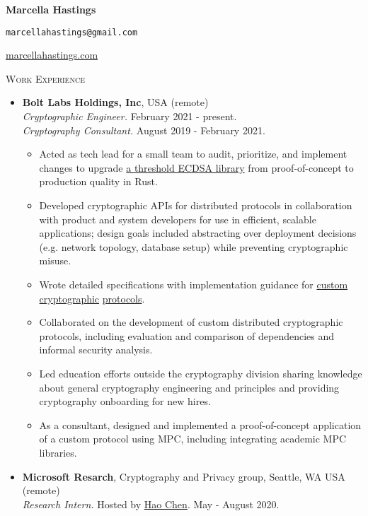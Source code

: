 \documentclass{article}
\newcommand{\textbox}[1]{\parbox{.333\textwidth}{#1}}
\begin{document}
\pagestyle{empty}
\noindent\textbox{\textbf{Marcella Hastings}\hfill}\textbox{\centering \texttt{marcellahastings@gmail.com}}\textbox{\hfill \href{http://marcellahastings.com}{marcellahastings.com}}

\textsc{Work Experience} \hrulefill
\begin{itemize}[label={}]
  \item \textbf{Bolt Labs Holdings, Inc}, USA (remote) \\
  \textit{Cryptographic Engineer.} February 2021 - present.\\
  \textit{Cryptography Consultant.} August 2019 - February 2021.
  \begin{itemize}[leftmargin=*, noitemsep, topsep=0pt]
    \item Acted as tech lead for a small team to audit, prioritize, and implement changes to upgrade \href{https://github.com/boltlabs-inc/tss-ecdsa}{a threshold ECDSA library} from proof-of-concept to production quality in Rust.
    \item Developed cryptographic APIs for distributed protocols in collaboration with product and system developers for use in efficient, scalable applications; design goals included abstracting over deployment decisions (e.g. network topology, database setup) while preventing cryptographic misuse.
    \item Wrote detailed specifications with implementation guidance for \href{https://github.com/boltlabs-inc/key-mgmt-spec}{custom cryptographic} \href{https://github.com/boltlabs-inc/zkchannels-spec}{protocols}. 
    \item Collaborated on the development of custom distributed cryptographic protocols, including evaluation and comparison of dependencies and informal security analysis.
    \item Led education efforts outside the cryptography division sharing knowledge about general cryptography engineering and principles and providing cryptography onboarding for new hires.
    \item As a consultant, designed and implemented a proof-of-concept application of a custom protocol using MPC, including integrating academic MPC libraries.
  \end{itemize}
  \item \textbf{Microsoft Resarch}, Cryptography and Privacy group, Seattle, WA USA (remote)\\
  \textit{Research Intern.} Hosted by \href{https://haochenuw.github.io/}{Hao Chen}. May - August 2020.
  \begin{itemize}[leftmargin=*, noitemsep, topsep=0pt, partopsep=0pt]

\end{itemize}
\end{itemize}
\end{document}
